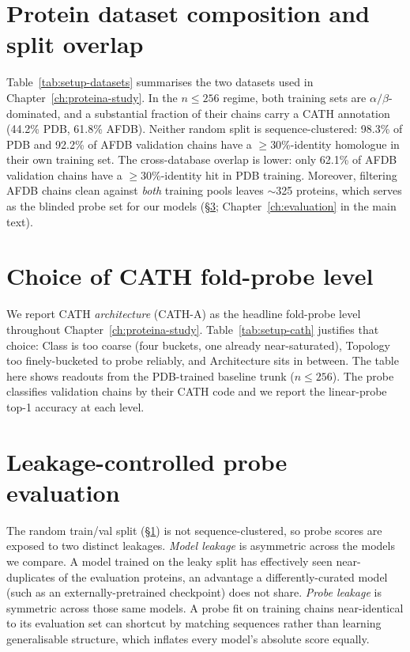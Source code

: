 \documentclass[12pt,a4paper,twoside]{report}
\begin{document}

\section{Protein dataset composition and split overlap}
\label{app:datasets}



Table~\ref{tab:setup-datasets} summarises the two datasets used in Chapter~\ref{ch:proteina-study}. In the $n{\le}256$ regime, both training sets are $\alpha/\beta$-dominated, and a substantial fraction of their chains carry a CATH annotation (44.2\% PDB, 61.8\% AFDB). Neither random split is sequence-clustered: 98.3\% of PDB and 92.2\% of AFDB validation chains have a $\ge$30\%-identity homologue in their own training set. The cross-database overlap is lower: only 62.1\% of AFDB validation chains have a $\ge$30\%-identity hit in PDB training. Moreover, filtering AFDB chains clean against \emph{both} training pools leaves $\sim$325 proteins, which serves as the blinded probe set for our models (\S\ref{app:leakage}; Chapter~\ref{ch:evaluation} in the main text).

\section{Choice of CATH fold-probe level}
\label{app:cath}

We report CATH \emph{architecture} (CATH-A) as the headline fold-probe level throughout Chapter~\ref{ch:proteina-study}. Table~\ref{tab:setup-cath} justifies that choice: Class is too coarse (four buckets, one already near-saturated), Topology too finely-bucketed to probe reliably, and Architecture sits in between. The table here shows readouts from the PDB-trained baseline trunk ($n{\le}256$). The probe classifies validation chains by their CATH code and we report the linear-probe top-1 accuracy at each level.



\section{Leakage-controlled probe evaluation}
\label{app:leakage}

The random train/val split (\S\ref{app:datasets}) is not sequence-clustered, so probe scores are exposed to two distinct leakages. \emph{Model leakage} is asymmetric across the models we compare. A model trained on the leaky split has effectively seen near-duplicates of the evaluation proteins, an advantage a differently-curated model (such as an externally-pretrained checkpoint) does not share. \emph{Probe leakage} is symmetric across those same models. A probe fit on training chains near-identical to its evaluation set can shortcut by matching sequences rather than learning generalisable structure, which inflates every model's absolute score equally.
\end{document}
